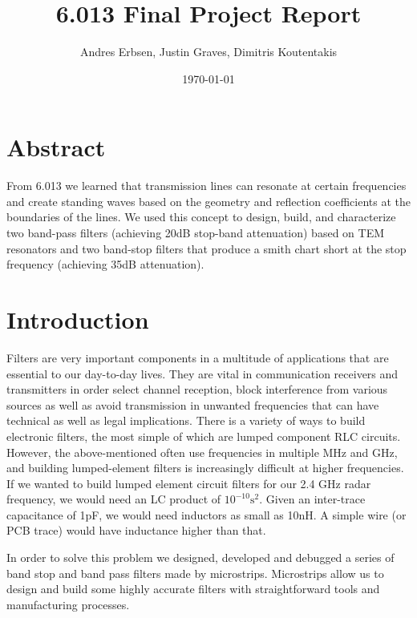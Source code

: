\documentclass[letterpaper, 11pt, twocolumn]{article}
\begin{document}
\title{\vspace{-15mm} 6.013 Final Project Report}
\author{Andres Erbsen, Justin Graves, Dimitris Koutentakis}
\date{\today}
\maketitle
\section{Abstract}
From 6.013 we learned that transmission lines can resonate at certain
frequencies and create standing waves based on the geometry and reflection
coefficients at the boundaries of the lines. We used this concept to design,
build, and characterize two band-pass filters (achieving 20dB stop-band
attenuation) based on TEM resonators and two band-stop filters that produce a
smith chart short at the stop frequency (achieving 35dB attenuation).

\section {Introduction}
Filters are very important components in a multitude of applications that are
essential to our day-to-day lives. They are vital in communication receivers and
transmitters in order select channel reception, block interference from various
sources as well as avoid transmission in unwanted frequencies that can have
technical as well as legal implications.  There is a variety of ways to build
electronic filters, the most simple of which are lumped component RLC 
circuits. However, the above-mentioned often use frequencies in multiple MHz and
GHz, and building lumped-element filters is increasingly difficult at higher
frequencies.  If we wanted to build lumped
element circuit filters for our 2.4 GHz radar
frequency, we would need an LC product of $10^{-10}\text{s}^2$. Given an
inter-trace capacitance of 1pF, we would need inductors as small as 10nH.
A simple wire (or PCB trace) would have inductance higher than that.

In order to solve this problem we designed, developed and debugged a series of
band stop and band pass filters made by microstrips. Microstrips allow us to
design and build some highly accurate filters with straightforward tools and
manufacturing processes.
\end{document}
